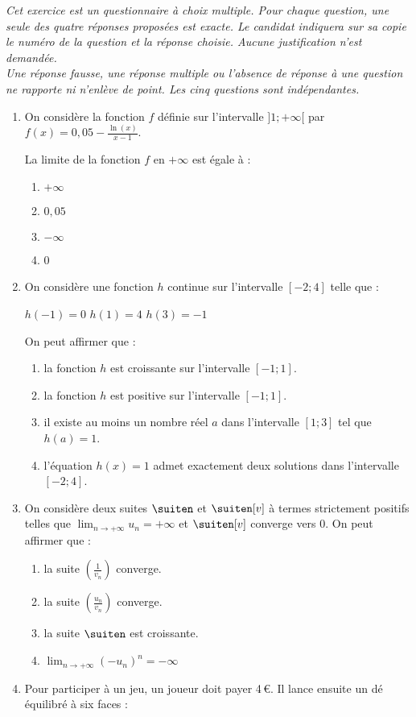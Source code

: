 \emph{Cet exercice est un questionnaire à choix multiple. Pour chaque question, une seule des quatre réponses proposées est exacte. Le candidat indiquera sur sa copie le numéro de la question et la réponse choisie. Aucune justification n'est demandée.\\ Une réponse fausse, une réponse multiple ou l'absence de réponse à une question ne rapporte ni n'enlève de point. Les cinq questions sont indépendantes.}

\medskip

\begin{enumerate}
	\item On considère la fonction $f$ définie sur l'intervalle $]1;+\infty[$ par $f(x)=0,05 - \frac{\ln(x)}{x-1}$.
	
	La limite de la fonction $f$ en $+\infty$ est égale à :
	\begin{enumerate}
		\item $+\infty$
		\item $0,05$
		\item $-\infty$
		\item 0
	\end{enumerate}
	\item On considère une fonction $h$ continue sur l'intervalle $[-2;4]$ telle que :
	
	$h(-1) = 0$ \quad  $h(1) = 4$ \quad  $h(3) = -1$
	
	\smallskip
	
	On peut affirmer que :
	\begin{enumerate}
		\item la fonction $h$ est croissante sur l'intervalle $[-1;1]$.
		\item la fonction $h$ est positive sur l'intervalle $[-1;1]$.
		\item il existe au moins un nombre réel $a$ dans l'intervalle $[1;3]$ tel que $h(a) = 1$.
		\item l'équation $h(x) = 1$ admet exactement deux solutions dans l'intervalle $[-2;4]$.
	\end{enumerate}
	\item On considère deux suites $\suiten$ et $\suiten[v]$ à termes strictement positifs telles que $\displaystyle\lim_{n \to +\infty} u_n = +\infty$ et $\suiten[v]$ converge vers 0. On peut affirmer que :
	\begin{enumerate}
		\item la suite $\left(\frac{1}{v_n}\right)$ converge.
		\item la suite $\left(\frac{u_n}{v_n}\right)$ converge.
		\item la suite $\suiten$ est croissante.
		\item $\displaystyle\lim_{n \to +\infty} (-u_n)^n = -\infty$
	\end{enumerate}
	\item Pour participer à un jeu, un joueur doit payer 4\,€. Il lance ensuite un dé équilibré à six faces :
	

\end{enumerate}
